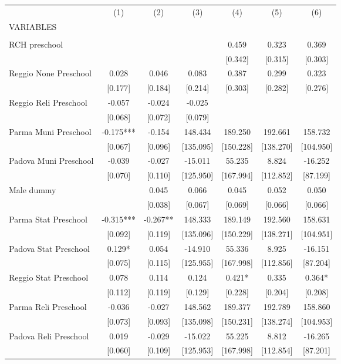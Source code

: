 \begin{tabular}{lcccccc} \hline
 & (1) & (2) & (3) & (4) & (5) & (6) \\
VARIABLES &  &  &  &  &  &  \\ \hline
 &  &  &  &  &  &  \\
RCH preschool &  &  &  & 0.459 & 0.323 & 0.369 \\
 &  &  &  & [0.342] & [0.315] & [0.303] \\
Reggio None Preschool & 0.028 & 0.046 & 0.083 & 0.387 & 0.299 & 0.323 \\
 & [0.177] & [0.184] & [0.214] & [0.303] & [0.282] & [0.276] \\
Reggio Reli Preschool & -0.057 & -0.024 & -0.025 &  &  &  \\
 & [0.068] & [0.072] & [0.079] &  &  &  \\
Parma Muni Preschool & -0.175*** & -0.154 & 148.434 & 189.250 & 192.661 & 158.732 \\
 & [0.067] & [0.096] & [135.095] & [150.228] & [138.270] & [104.950] \\
Padova Muni Preschool & -0.039 & -0.027 & -15.011 & 55.235 & 8.824 & -16.252 \\
 & [0.070] & [0.110] & [125.950] & [167.994] & [112.852] & [87.199] \\
Male dummy &  & 0.045 & 0.066 & 0.045 & 0.052 & 0.050 \\
 &  & [0.038] & [0.067] & [0.069] & [0.066] & [0.066] \\
Parma Stat Preschool & -0.315*** & -0.267** & 148.333 & 189.149 & 192.560 & 158.631 \\
 & [0.092] & [0.119] & [135.096] & [150.229] & [138.271] & [104.951] \\
Padova Stat Preschool & 0.129* & 0.054 & -14.910 & 55.336 & 8.925 & -16.151 \\
 & [0.075] & [0.115] & [125.955] & [167.998] & [112.856] & [87.204] \\
Reggio Stat Preschool & 0.078 & 0.114 & 0.124 & 0.421* & 0.335 & 0.364* \\
 & [0.112] & [0.119] & [0.129] & [0.228] & [0.204] & [0.208] \\
Parma Reli Preschool & -0.036 & -0.027 & 148.562 & 189.377 & 192.789 & 158.860 \\
 & [0.073] & [0.093] & [135.098] & [150.231] & [138.274] & [104.953] \\
Padova Reli Preschool & 0.019 & -0.029 & -15.022 & 55.225 & 8.812 & -16.265 \\
 & [0.060] & [0.109] & [125.953] & [167.998] & [112.854] & [87.201] \\

\end{tabular}
